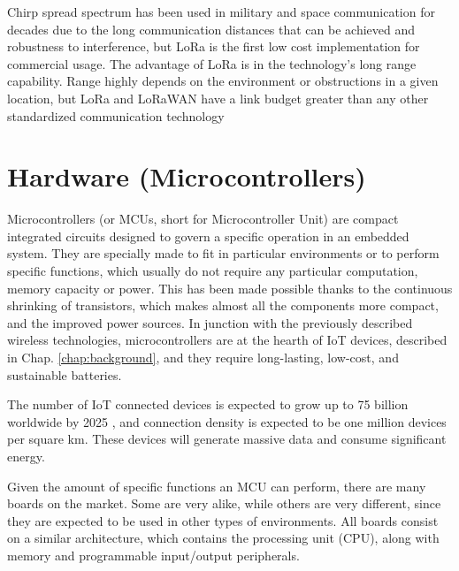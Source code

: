 	Chirp spread spectrum has been used in
	military and space communication for decades due to the long
	communication distances that can be achieved and robustness
	to interference, but LoRa is the ﬁrst low cost implementation
	for commercial usage. The advantage of LoRa is in the
	technology’s long range capability. Range highly depends on
	the environment or obstructions in a given location, but LoRa
	and LoRaWAN have a link budget greater than any other
	standardized communication technology
	
	\section{Hardware (Microcontrollers)}\label{sec:microcontrollers}
	
	
		Microcontrollers (or MCUs, short for Microcontroller Unit) are compact integrated circuits designed to govern a specific operation in an embedded system.
		They are specially made to fit in particular environments or to perform specific functions, which usually do not require any particular computation, memory capacity or power.
		This has been made possible thanks to the continuous shrinking of transistors, which makes almost all the components more compact, and the improved power sources.
		In junction with the previously described wireless technologies, microcontrollers are at the hearth of IoT devices, described in Chap. \ref{chap:background}, and they require long-lasting, low-cost, and sustainable batteries.
		
		The number of IoT connected devices is expected to grow up to 75 billion worldwide by 2025 \cite{statista}, and connection density is expected to be one million devices per square km\cite{noma}.
		These devices will generate massive data and consume significant energy.
		
		Given the amount of specific functions an MCU can perform, there are many boards on the market.
		Some are very alike, while others are very different, since they are expected to be used in other types of environments.
		All boards consist on a similar architecture, which contains the processing unit (CPU), along with memory and programmable input/output peripherals.
		
